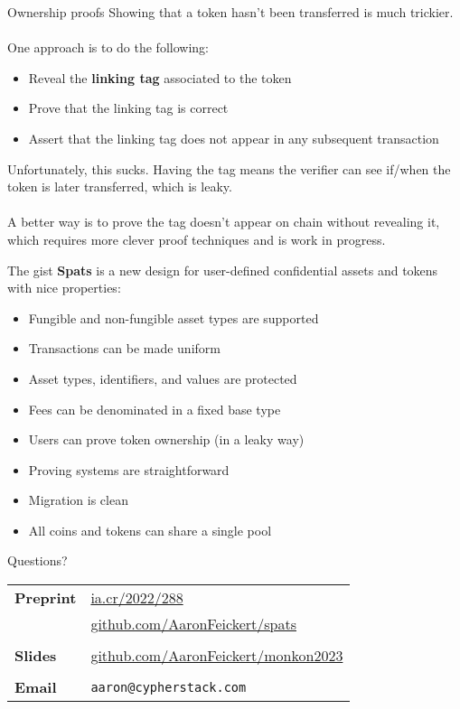 \documentclass[aspectratio=169]{beamer}
\begin{document}
\begin{frame}{Ownership proofs}
	Showing that a token hasn't been transferred is much trickier. \\~\\

	One approach is to do the following:
	\begin{itemize}
		\item Reveal the \textbf{linking tag} associated to the token
		\item Prove that the linking tag is correct
		\item Assert that the linking tag does not appear in any subsequent transaction
	\end{itemize}
	
	Unfortunately, this sucks.
	Having the tag means the verifier can see if/when the token is later transferred, which is leaky. \\~\\

	A better way is to prove the tag doesn't appear on chain without revealing it, which requires more clever proof techniques and is work in progress.
\end{frame}

\begin{frame}{The gist}
	\textbf{Spats} is a new design for user-defined confidential assets and tokens with nice properties:
	\begin{itemize}
		\item Fungible and non-fungible asset types are supported
		\item Transactions can be made uniform
		\item Asset types, identifiers, and values are protected
		\item Fees can be denominated in a fixed base type
		\item Users can prove token ownership (in a leaky way)
		\item Proving systems are straightforward
		\item Migration is clean
		\item All coins and tokens can share a single pool
	\end{itemize}
\end{frame}

\begin{frame}{Questions?}
	\Large
	\begin{center}
		\begin{tabular}{ll}
			\textbf{Preprint} & \url{ia.cr/2022/288} \\
			& \url{github.com/AaronFeickert/spats} \\
			\\
			\textbf{Slides} & \url{github.com/AaronFeickert/monkon2023} \\
			\\
			\textbf{Email} & \texttt{aaron@cypherstack.com}
		\end{tabular}
	\end{center}
\end{frame}
	
\end{document}
